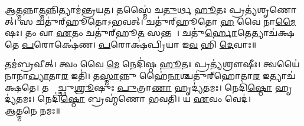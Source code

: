 𑌆\ul{𑌤𑍍𑌮}𑌨𑍍𑌨𑌾\ul{𑌤𑍍𑌮}𑌨𑍍𑌨𑌿𑌤𑍍𑌯𑌾𑌮॑𑌨𑍍𑌤𑍍𑌰𑌯𑌤। 𑌤𑌸𑍍𑌮𑍈॑ 𑌚\ul{𑌤𑍁}𑌰𑍍𑌥 \ul{𑌹𑍂}𑌤𑌃 𑌪𑍍𑌰𑌤𑍍𑌯॑𑌶𑍃𑌣𑍋𑌤𑍍। 𑌸 𑌚𑌤𑍁॑𑌰𑍍‌𑌹𑍂𑌤𑍋𑌽𑌭𑌵𑌤𑍍। 𑌚𑌤𑍁॑𑌰𑍍‌𑌹𑍂𑌤𑍋 \ul{𑌹} 𑌵𑍈 𑌨𑌾\ul{𑌮𑍈}𑌷𑌃। 𑌤𑌂 𑌵𑌾 \ul{𑌏}𑌤𑌂 𑌚𑌤𑍁॑𑌰𑍍‌𑌹𑍂\ul{𑌤}\ul{} 𑌸𑌨𑍍𑌤𑌮𑍍᳚। 𑌚𑌤𑍁॑\ul{𑌰𑍍𑌹𑍋}𑌤𑍇𑌤𑍍𑌯𑌾𑌚॑𑌕𑍍𑌷𑌤𑍇 \ul{𑌪}𑌰𑍋𑌕𑍍𑌷𑍇॑𑌣। \ul{𑌪}𑌰𑍋𑌕𑍍𑌷॑𑌪𑍍𑌰𑌿𑌯𑌾 𑌇\ul{𑌵} 𑌹𑌿 \ul{𑌦𑍇}𑌵𑌾𑌃॥

𑌤𑌮॑𑌬𑍍𑌰𑌵𑍀𑌤𑍍। 𑌤𑍍𑌵𑌂 𑌵𑍈 \ul{𑌮𑍇} 𑌨𑍇𑌦𑌿॑𑌷𑍍𑌠 \ul{𑌹𑍂}𑌤𑌃 𑌪𑍍𑌰𑌤𑍍𑌯॑𑌶𑍍𑌰𑍗𑌷𑍀𑌃। 𑌤𑍍𑌵𑌯𑍈॑𑌨𑌾𑌨𑌾\ul{𑌖𑍍𑌯𑌾}𑌤𑌾\ul{𑌰} 𑌇𑌤𑌿॑। 𑌤\ul{𑌸𑍍𑌮𑌾}𑌨𑍍𑌨𑍁 𑌹𑍈॑\ul{𑌨𑌾}\ul{}𑌶𑍍𑌚𑌤𑍁॑𑌰𑍍‌𑌹𑍋𑌤𑌾\ul{𑌰} 𑌇𑌤𑍍𑌯𑌾𑌚॑𑌕𑍍𑌷𑌤𑍇। 𑌤𑌸𑍍𑌮𑌾᳚𑌚𑍍𑌛𑍁\ul{𑌶𑍍𑌰𑍂}𑌷𑍁𑌃 \ul{𑌪𑍁}𑌤𑍍𑌰𑌾\ul{𑌣𑌾}\ul{} 𑌹𑍃𑌦𑍍𑌯॑𑌤𑌮𑌃। 𑌨𑍇𑌦𑌿॑\ul{𑌷𑍍𑌠𑍋} 𑌹𑍃𑌦𑍍𑌯॑𑌤𑌮𑌃। 𑌨𑍇𑌦𑌿॑\ul{𑌷𑍍𑌠𑍋} 𑌬𑍍𑌰𑌹𑍍𑌮॑𑌣𑍋 𑌭𑌵𑌤𑌿। 𑌯 \ul{𑌏}𑌵𑌂 𑌵𑍇𑌦॑।\\
𑌆𑌤𑍍𑌮𑌨𑍇 𑌨𑌮𑌃॥


\newcommand{\ssankalpa}[1]{\refstepcounter{ssk} 
#1𑌤\ul{𑌨𑍍𑌮𑍇} 𑌮𑌨𑌃॑ \ul{𑌶𑌿}𑌵𑌸॑\ul{𑌙𑍍𑌕}𑌲𑍍𑌪𑌮॑𑌸𑍍𑌤𑍁॥\devanumber{\arabic{ssk}}॥}
\newcommand{\ssankalpaalign}[2]{
\setcounter{shlokacount}{\value{ssk}}
\twolineshloka{#1}{#2𑌤\ul{𑌨𑍍𑌮𑍇} 𑌮𑌨𑌃॑ \ul{𑌶𑌿}𑌵𑌸॑\ul{𑌙𑍍𑌕}𑌲𑍍𑌪𑌮॑𑌸𑍍𑌤𑍁}
\refstepcounter{ssk}
\pagebreak[0]}

